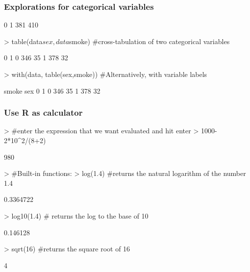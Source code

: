 \documentclass{beamer}
\begin{document}
\begin{frame}[fragile]\frametitle{Explorations for categorical variables}
\begin{Schunk}
\begin{Soutput}
  0   1 
381 410 
\end{Soutput}
\end{Schunk}
\pause
\begin{Schunk}
\begin{Sinput}
> table(data$sex,data$smoke) #cross-tabulation of two categorical variables
\end{Sinput}
\begin{Soutput}
      0   1
  0 346  35
  1 378  32
\end{Soutput}
\end{Schunk}
\pause
\begin{Schunk}
\begin{Sinput}
> with(data, table(sex,smoke)) #Alternatively, with variable labels
\end{Sinput}
\begin{Soutput}
   smoke
sex   0   1
  0 346  35
  1 378  32
\end{Soutput}
\end{Schunk}
\end{frame}

\begin{frame}[fragile]\frametitle{Use R as calculator}
\begin{Schunk}
\begin{Sinput}
> #enter the expression that we want evaluated and hit enter
> 1000-2*10^2/(8+2)
\end{Sinput}
\begin{Soutput}
[1] 980
\end{Soutput}
\end{Schunk}
\begin{Schunk}
\begin{Sinput}
> #Built-in functions:
> log(1.4)  #returns the natural logarithm of the number 1.4
\end{Sinput}
\begin{Soutput}
[1] 0.3364722
\end{Soutput}
\begin{Sinput}
> log10(1.4)  # returns the log to the base of 10
\end{Sinput}
\begin{Soutput}
[1] 0.146128
\end{Soutput}
\begin{Sinput}
> sqrt(16)  #returns the square root of 16
\end{Sinput}
\begin{Soutput}
[1] 4
\end{Soutput}
\end{Schunk}
\end{frame}
\end{document}
